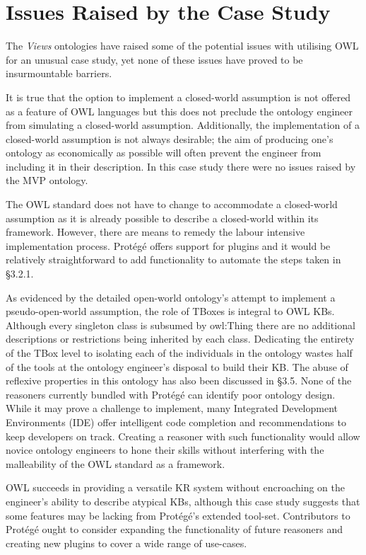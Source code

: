 \documentclass[titlepage,a4paper,12pt,oneside]{book}
\begin{document}
\section{Issues Raised by the Case Study}
The \textit{Views} ontologies have raised some of the potential issues with utilising OWL for an unusual case study, yet none of these issues have proved to be insurmountable barriers.\par
It is true that the option to implement a closed-world assumption is not offered as a feature of OWL languages but this does not preclude the ontology engineer from simulating a closed-world assumption.
Additionally, the implementation of a closed-world assumption is not always desirable; the aim of producing one's ontology as economically as possible will often prevent the engineer from including it in their description.
In this case study there were no issues raised by the MVP ontology.\par
The OWL standard does not have to change to accommodate a closed-world assumption as it is already possible to describe a closed-world within its framework.
However, there are means to remedy the labour intensive implementation process.
Protégé offers support for plugins and it would be relatively straightforward to add functionality to automate the steps taken in §3.2.1.\par
As evidenced by the detailed open-world ontology's attempt to implement a pseudo-open-world assumption, the role of TBoxes is integral to OWL KBs.
Although every singleton class is subsumed by owl:Thing there are no additional descriptions or restrictions being inherited by each class.
Dedicating the entirety of the TBox level to isolating each of the individuals in the ontology wastes half of the tools at the ontology engineer's disposal to build their KB.
The abuse of reflexive properties in this ontology has also been discussed in §3.5.
None of the reasoners currently bundled with Protégé can identify poor ontology design.
While it may prove a challenge to implement, many Integrated Development Environments (IDE) offer intelligent code completion and recommendations to keep developers on track.
Creating a reasoner with such functionality would allow novice ontology engineers to hone their skills without interfering with the malleability of the OWL standard as a framework.\par
OWL succeeds in providing a versatile KR system without encroaching on the engineer's ability to describe atypical KBs, although this case study suggests that some features may be lacking from Protégé's extended tool-set.
Contributors to Protégé ought to consider expanding the functionality of future reasoners and creating new plugins to cover a wide range of use-cases.\par
\end{document}
